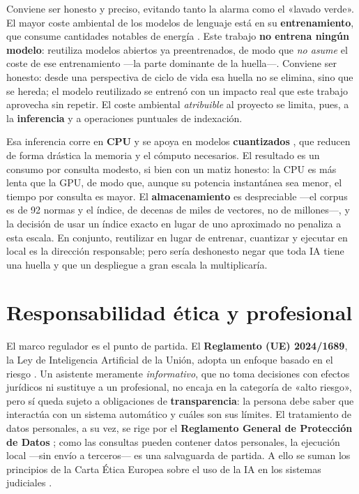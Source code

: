 Conviene ser honesto y preciso, evitando tanto la alarma como el «lavado verde». El mayor coste ambiental de los modelos de lenguaje está en su \textbf{entrenamiento}, que consume cantidades notables de energía \cite{strubell2019energy}. Este trabajo \textbf{no entrena ningún modelo}: reutiliza modelos abiertos ya preentrenados, de modo que \emph{no asume} el coste de ese entrenamiento —la parte dominante de la huella—. Conviene ser honesto: desde una perspectiva de ciclo de vida esa huella no se elimina, sino que se hereda; el modelo reutilizado se entrenó con un impacto real que este trabajo aprovecha sin repetir. El coste ambiental \emph{atribuible} al proyecto se limita, pues, a la \textbf{inferencia} y a operaciones puntuales de indexación.

Esa inferencia corre en \textbf{CPU} y se apoya en modelos \textbf{cuantizados} \cite{frantar2023gptq}, que reducen de forma drástica la memoria y el cómputo necesarios. El resultado es un consumo por consulta modesto, si bien con un matiz honesto: la CPU es más lenta que la GPU, de modo que, aunque su potencia instantánea sea menor, el tiempo por consulta es mayor. El \textbf{almacenamiento} es despreciable —el corpus es de 92 normas y el índice, de decenas de miles de vectores, no de millones—, y la decisión de usar un índice exacto en lugar de uno aproximado no penaliza a esta escala. En conjunto, reutilizar en lugar de entrenar, cuantizar y ejecutar en local es la dirección responsable; pero sería deshonesto negar que toda IA tiene una huella y que un despliegue a gran escala la multiplicaría.

\section{Responsabilidad ética y profesional}
\label{sec:responsabilidad}

El marco regulador es el punto de partida. El \textbf{Reglamento (UE) 2024/1689}, la Ley de Inteligencia Artificial de la Unión, adopta un enfoque basado en el riesgo \cite{euAiAct2024}. Un asistente meramente \emph{informativo}, que no toma decisiones con efectos jurídicos ni sustituye a un profesional, no encaja en la categoría de «alto riesgo», pero sí queda sujeto a obligaciones de \textbf{transparencia}: la persona debe saber que interactúa con un sistema automático y cuáles son sus límites. El tratamiento de datos personales, a su vez, se rige por el \textbf{Reglamento General de Protección de Datos} \cite{gdpr2016}; como las consultas pueden contener datos personales, la ejecución local —sin envío a terceros— es una salvaguarda de partida. A ello se suman los principios de la Carta Ética Europea sobre el uso de la IA en los sistemas judiciales \cite{cepejEthicalCharter}.


